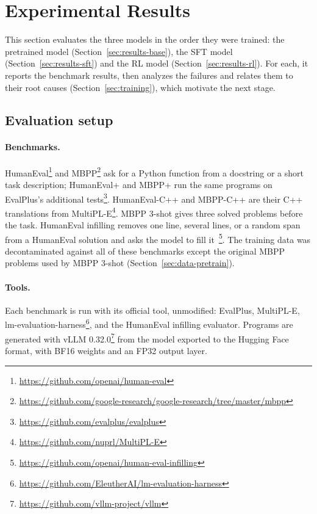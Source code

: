 \documentclass[sigconf,nonacm,balance=false]{acmart}
\begin{document}
\section{Experimental Results}
\label{sec:results}

This section evaluates the three models in the order they were trained: the pretrained model
(Section~\ref{sec:results-base}), the SFT model (Section~\ref{sec:results-sft}) and the RL model
(Section~\ref{sec:results-rl}). For each, it reports the benchmark results, then analyzes the failures and relates them
to their root causes (Section~\ref{sec:training}), which motivate the next stage.

\subsection{Evaluation setup}
\label{sec:results-setup}

\paragraph{Benchmarks.} HumanEval\footnote{\url{https://github.com/openai/human-eval}} and
MBPP\footnote{\url{https://github.com/google-research/google-research/tree/master/mbpp}} ask for a Python function
from a docstring or a short task description; HumanEval+ and MBPP+ run the same programs on EvalPlus's additional
tests\footnote{\url{https://github.com/evalplus/evalplus}}. HumanEval-C++ and MBPP-C++ are their C++ translations
from MultiPL-E\footnote{\url{https://github.com/nuprl/MultiPL-E}}. MBPP 3-shot gives three solved problems before the
task. HumanEval infilling removes one line, several lines, or a random span from a HumanEval solution and asks the
model to fill it~\cite{bavarian2022fim}\footnote{\url{https://github.com/openai/human-eval-infilling}}. The training
data was decontaminated against all of these benchmarks except the original
MBPP problems used by MBPP 3-shot (Section~\ref{sec:data-pretrain}).

\paragraph{Tools.} Each benchmark is run with its official tool, unmodified: EvalPlus, MultiPL-E,
lm-evaluation-harness\footnote{\url{https://github.com/EleutherAI/lm-evaluation-harness}}, and the HumanEval
infilling evaluator. Programs are generated with vLLM 0.32.0\footnote{\url{https://github.com/vllm-project/vllm}}
from the model exported to the Hugging Face format, with BF16 weights and an FP32 output
layer.
\end{document}
